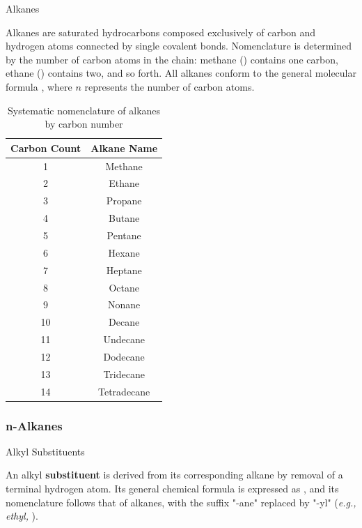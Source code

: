 \documentclass[10pt]{article}
\begin{document}
    \begin{core}[label=core:alkanes]{Alkanes}

      Alkanes are saturated hydrocarbons composed exclusively of carbon and hydrogen atoms connected by single covalent bonds. Nomenclature is determined by the number of carbon atoms in the chain: methane () contains one carbon, ethane () contains two, and so forth. All alkanes conform to the general molecular formula , where $n$ represents the number of carbon atoms.

      \begin{table}[H]
        \centering
        \begin{tabular}{cc}
          \hline
          Carbon Count & Alkane Name \\
          \hline
          1 & Methane \\
          2 & Ethane \\
          3 & Propane \\
          4 & Butane \\
          5 & Pentane \\
          6 & Hexane \\
          7 & Heptane \\
          8 & Octane \\
          9 & Nonane \\
          10 & Decane \\
          11 & Undecane \\
          12 & Dodecane \\
          13 & Tridecane \\
          14 & Tetradecane \\
          \hline
        \end{tabular}
        \caption{Systematic nomenclature of alkanes by carbon number}
        \label{tab:alkanes}
      \end{table}

    \end{core}

    \subsubsection{n-Alkanes}

      \begin{core}{Alkyl Substituents}

        An alkyl \textbf{substituent} is derived from its corresponding alkane by removal of a terminal hydrogen atom. Its general chemical formula is expressed as , and its nomenclature follows that of alkanes, with the suffix "-ane" replaced by "-yl" (\textit{e.g., ethyl, }).

        
      \end{core}
\end{document}
